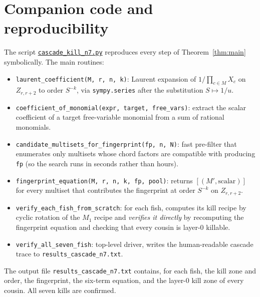 \documentclass[11pt]{article}
\theoremstyle{definition}
\begin{document}
\section{Companion code and reproducibility}\label{sec:code}

The script
\href{https://github.com/Jony-GydeRnE/locality-proof/blob/main/cascade_kill_n7.py}%
{\tt cascade\_kill\_n7.py} reproduces every step of
Theorem~\ref{thm:main} symbolically. The main routines:

\begin{itemize}[leftmargin=*,topsep=2pt,parsep=0pt,itemsep=2pt]
\item \texttt{laurent\_coefficient(M, r, n, k)}: Laurent expansion of
       $1/\prod_{c\in M} X_c$ on $Z_{r,r+2}$ to order $S^{-k}$, via
       \texttt{sympy.series} after the substitution $S\mapsto 1/u$.
\item \texttt{coefficient\_of\_monomial(expr, target, free\_vars)}:
       extract the scalar coefficient of a target free-variable
       monomial from a sum of rational monomials.
\item \texttt{candidate\_multisets\_for\_fingerprint(fp, n, N)}: fast
       pre-filter that enumerates only multisets whose chord factors are
       compatible with producing \texttt{fp} (so the search runs in
       seconds rather than hours).
\item \texttt{fingerprint\_equation(M, r, n, k, fp, pool)}: returns
       $[(M', \text{scalar})]$ for every multiset that contributes the
       fingerprint at order $S^{-k}$ on $Z_{r,r+2}$.
\item \texttt{verify\_each\_fish\_from\_scratch}: for each fish,
       computes its kill recipe by cyclic rotation of the $M_1$ recipe
       and \emph{verifies it directly} by recomputing the fingerprint
       equation and checking that every cousin is layer-0 killable.
\item \texttt{verify\_all\_seven\_fish}: top-level driver, writes the
       human-readable cascade trace to \texttt{results\_cascade\_n7.txt}.
\end{itemize}

The output file \texttt{results\_cascade\_n7.txt} contains, for each
fish, the kill zone and order, the fingerprint, the six-term equation,
and the layer-0 kill zone of every cousin. All seven kills are
confirmed.

\end{document}
